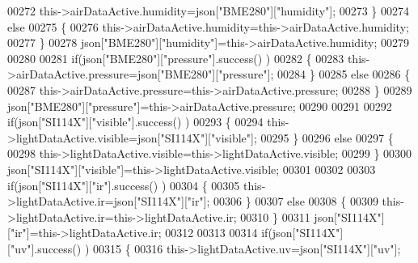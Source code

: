 \begin{DoxyCode}
00272                 this->airDataActive.humidity=json[\textcolor{stringliteral}{"BME280"}][\textcolor{stringliteral}{"humidity"}];
00273             \}
00274             \textcolor{keywordflow}{else}
00275             \{
00276                 this->airDataActive.humidity=this->airDataActive.humidity;
00277             \}
00278             json[\textcolor{stringliteral}{"BME280"}][\textcolor{stringliteral}{"humidity"}]=this->airDataActive.humidity;
00279             
00280             
00281             \textcolor{keywordflow}{if}(json[\textcolor{stringliteral}{"BME280"}][\textcolor{stringliteral}{"pressure"}].success() )
00282             \{
00283                 this->airDataActive.pressure=json[\textcolor{stringliteral}{"BME280"}][\textcolor{stringliteral}{"pressure"}];
00284             \}
00285             \textcolor{keywordflow}{else}
00286             \{
00287                 this->airDataActive.pressure=this->airDataActive.pressure;
00288             \}
00289             json[\textcolor{stringliteral}{"BME280"}][\textcolor{stringliteral}{"pressure"}]=this->airDataActive.pressure;
00290 
00291             
00292             \textcolor{keywordflow}{if}(json[\textcolor{stringliteral}{"SI114X"}][\textcolor{stringliteral}{"visible"}].success() )
00293             \{
00294                 this->lightDataActive.visible=json[\textcolor{stringliteral}{"SI114X"}][\textcolor{stringliteral}{"visible"}];
00295             \}
00296             \textcolor{keywordflow}{else}
00297             \{
00298                 this->lightDataActive.visible=this->lightDataActive.visible;
00299             \}
00300             json[\textcolor{stringliteral}{"SI114X"}][\textcolor{stringliteral}{"visible"}]=this->lightDataActive.visible;
00301             
00302             
00303             \textcolor{keywordflow}{if}(json[\textcolor{stringliteral}{"SI114X"}][\textcolor{stringliteral}{"ir"}].success() )
00304             \{           
00305                 this->lightDataActive.ir=json[\textcolor{stringliteral}{"SI114X"}][\textcolor{stringliteral}{"ir"}];
00306             \}
00307             \textcolor{keywordflow}{else}
00308             \{
00309                 this->lightDataActive.ir=this->lightDataActive.ir;
00310             \}
00311             json[\textcolor{stringliteral}{"SI114X"}][\textcolor{stringliteral}{"ir"}]=this->lightDataActive.ir;
00312 
00313             
00314             \textcolor{keywordflow}{if}(json[\textcolor{stringliteral}{"SI114X"}][\textcolor{stringliteral}{"uv"}].success() )         
00315             \{           
00316                 this->lightDataActive.uv=json[\textcolor{stringliteral}{"SI114X"}][\textcolor{stringliteral}{"uv"}];

\end{DoxyCode}
